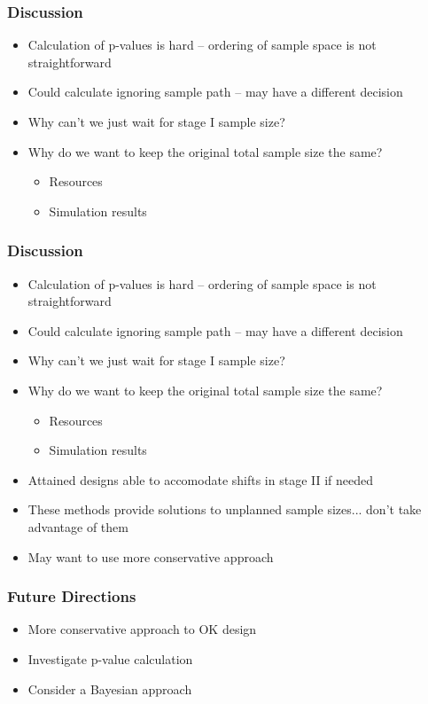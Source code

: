 \documentclass{beamer}\usepackage[]{graphicx}\usepackage[]{color}
\begin{document}
\begin{frame}[t]
\frametitle{Discussion}
    \begin{itemize}
        \item Calculation of p-values is hard -- ordering of sample space is not straightforward
        \item Could calculate ignoring sample path -- may have a different decision %
        \item Why can't we just wait for stage I sample size?
        \item Why do we want to keep the original total sample size the same?
          \begin{itemize}
            \item Resources
            \item Simulation results
          \end{itemize}
    \end{itemize}
\end{frame}

\begin{frame}[t]
\frametitle{Discussion}
    \begin{itemize}
        \item Calculation of p-values is hard -- ordering of sample space is not straightforward
        \item Could calculate ignoring sample path -- may have a different decision %
        \item Why can't we just wait for stage I sample size?
        \item Why do we want to keep the original total sample size the same?
          \begin{itemize}
            \item Resources
            \item Simulation results
          \end{itemize}
        \item Attained designs able to accomodate shifts in stage II if needed
        \item These methods provide solutions to unplanned sample sizes... don't take advantage of them
        \item May want to use more conservative approach
    \end{itemize}
\end{frame}


\begin{frame}
\frametitle{Future Directions}
    \begin{itemize}
        \item More conservative approach to OK design
        \item Investigate p-value calculation 
        \item Consider a Bayesian approach
    \end{itemize}
\end{frame}
\end{document}
